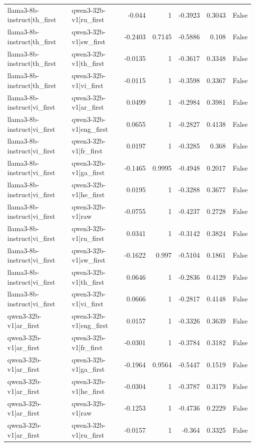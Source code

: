 \begin{table}
\begin{tabular}{l l r r r r l}
llama3-8b-instruct|th_first & qwen3-32b-v1|ru_first & -0.044 & 1 & -0.3923 & 0.3043 & False \\
llama3-8b-instruct|th_first & qwen3-32b-v1|sw_first & -0.2403 & 0.7145 & -0.5886 & 0.108 & False \\
llama3-8b-instruct|th_first & qwen3-32b-v1|th_first & -0.0135 & 1 & -0.3617 & 0.3348 & False \\
llama3-8b-instruct|th_first & qwen3-32b-v1|vi_first & -0.0115 & 1 & -0.3598 & 0.3367 & False \\
llama3-8b-instruct|vi_first & qwen3-32b-v1|ar_first & 0.0499 & 1 & -0.2984 & 0.3981 & False \\
llama3-8b-instruct|vi_first & qwen3-32b-v1|eng_first & 0.0655 & 1 & -0.2827 & 0.4138 & False \\
llama3-8b-instruct|vi_first & qwen3-32b-v1|fr_first & 0.0197 & 1 & -0.3285 & 0.368 & False \\
llama3-8b-instruct|vi_first & qwen3-32b-v1|ga_first & -0.1465 & 0.9995 & -0.4948 & 0.2017 & False \\
llama3-8b-instruct|vi_first & qwen3-32b-v1|he_first & 0.0195 & 1 & -0.3288 & 0.3677 & False \\
llama3-8b-instruct|vi_first & qwen3-32b-v1|raw & -0.0755 & 1 & -0.4237 & 0.2728 & False \\
llama3-8b-instruct|vi_first & qwen3-32b-v1|ru_first & 0.0341 & 1 & -0.3142 & 0.3824 & False \\
llama3-8b-instruct|vi_first & qwen3-32b-v1|sw_first & -0.1622 & 0.997 & -0.5104 & 0.1861 & False \\
llama3-8b-instruct|vi_first & qwen3-32b-v1|th_first & 0.0646 & 1 & -0.2836 & 0.4129 & False \\
llama3-8b-instruct|vi_first & qwen3-32b-v1|vi_first & 0.0666 & 1 & -0.2817 & 0.4148 & False \\
qwen3-32b-v1|ar_first & qwen3-32b-v1|eng_first & 0.0157 & 1 & -0.3326 & 0.3639 & False \\
qwen3-32b-v1|ar_first & qwen3-32b-v1|fr_first & -0.0301 & 1 & -0.3784 & 0.3182 & False \\
qwen3-32b-v1|ar_first & qwen3-32b-v1|ga_first & -0.1964 & 0.9564 & -0.5447 & 0.1519 & False \\
qwen3-32b-v1|ar_first & qwen3-32b-v1|he_first & -0.0304 & 1 & -0.3787 & 0.3179 & False \\
qwen3-32b-v1|ar_first & qwen3-32b-v1|raw & -0.1253 & 1 & -0.4736 & 0.2229 & False \\
qwen3-32b-v1|ar_first & qwen3-32b-v1|ru_first & -0.0157 & 1 & -0.364 & 0.3325 & False \\

\end{tabular}
\end{table}
